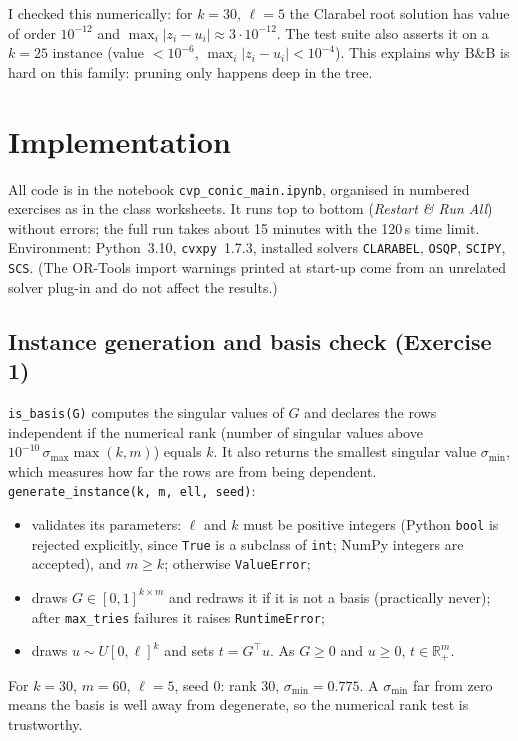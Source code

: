 \documentclass[11pt,a4paper]{article}
\newcommand{\R}{\mathbb{R}}
\newcommand{\BB}{B\&B}
\begin{document}
I checked this numerically: for $k=30$, $\ell=5$ the Clarabel root solution has value of order $10^{-12}$ and $\max_i|z_i-u_i|\approx3\cdot10^{-12}$. The test suite also asserts it on a $k=25$ instance (value $<10^{-6}$, $\max_i|z_i-u_i|<10^{-4}$). This explains why \BB{} is hard on this family: pruning only happens deep in the tree.

\section{Implementation}

All code is in the notebook \texttt{cvp\_conic\_main.ipynb}, organised in numbered exercises as in the class worksheets. It runs top to bottom (\emph{Restart \& Run All}) without errors; the full run takes about 15 minutes with the 120\,s time limit. Environment: Python~3.10, \texttt{cvxpy}~1.7.3, installed solvers \texttt{CLARABEL}, \texttt{OSQP}, \texttt{SCIPY}, \texttt{SCS}. (The OR-Tools import warnings printed at start-up come from an unrelated solver plug-in and do not affect the results.)

\subsection{Instance generation and basis check (Exercise 1)}

\texttt{is\_basis(G)} computes the singular values of $G$ and declares the rows independent if the numerical rank (number of singular values above $10^{-10}\,\sigma_{\max}\max(k,m)$) equals $k$. It also returns the smallest singular value $\sigma_{\min}$, which measures how far the rows are from being dependent. \texttt{generate\_instance(k, m, ell, seed)}:
\begin{itemize}
  \item validates its parameters: $\ell$ and $k$ must be positive integers (Python \texttt{bool} is rejected explicitly, since \texttt{True} is a subclass of \texttt{int}; NumPy integers are accepted), and $m\ge k$; otherwise \texttt{ValueError};
  \item draws $G\in[0,1]^{k\times m}$ and redraws it if it is not a basis (practically never); after \texttt{max\_tries} failures it raises \texttt{RuntimeError};
  \item draws $u\sim U[0,\ell]^k$ and sets $t=G^\top u$. As $G\ge 0$ and $u\ge 0$, $t\in\R^m_+$.
\end{itemize}
For $k=30$, $m=60$, $\ell=5$, seed $0$: rank $30$, $\sigma_{\min}=0.775$. A $\sigma_{\min}$ far from zero means the basis is well away from degenerate, so the numerical rank test is trustworthy.
\end{document}

